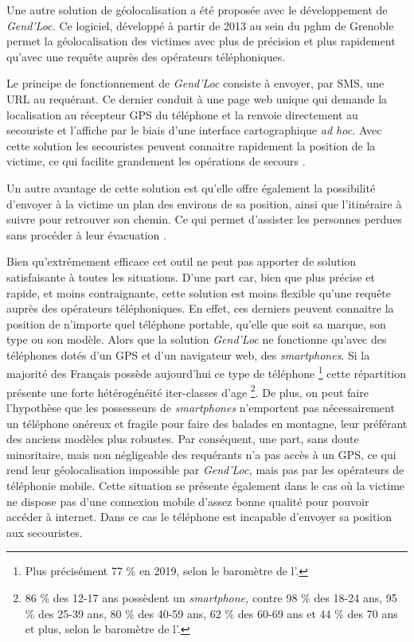Une autre solution de géolocalisation a été proposée avec le
développement de \emph{Gend'Loc.} Ce logiciel, développé à partir de
2013 au sein du \ac{pghm} de Grenoble permet la géolocalisation des
victimes avec plus de précision et plus rapidement qu'avec une requête
auprès des opérateurs téléphoniques.

Le principe de fonctionnement de \emph{Gend'Loc} consiste à envoyer,
par SMS, une URL au requérant. Ce dernier conduit à une page web
unique qui demande la localisation au récepteur GPS du téléphone et la
renvoie directement au secouriste et l'affiche par le biais d'une
interface cartographique \emph{ad hoc.}  Avec cette solution les
secouristes peuvent connaitre rapidement la position de la victime, ce
qui facilite grandement les opérations de secours
\autocite{Muscat2015}.

Un autre avantage de cette solution est qu'elle offre également la
possibilité d'envoyer à la victime un plan des environs de sa
position, ainsi que l'itinéraire à suivre pour retrouver son
chemin. Ce qui permet d'assister les personnes perdues sans procéder à
leur évacuation \autocite{Muscat2015}.

Bien qu’extrêmement efficace cet outil ne peut pas apporter de
solution satisfaisante à toutes les situations. D'une part car, bien
que plus précise et rapide, et moins contraignante, cette solution est
moins flexible qu'une requête auprès des opérateurs téléphoniques.
En effet, ces derniers peuvent connaitre la position de n'importe quel
téléphone portable, qu'elle que soit sa marque, son type ou son
modèle. Alors que la solution \emph{Gend'Loc} ne fonctionne qu'avec
des téléphones dotés d'un GPS et d'un navigateur web, des
\emph{smartphones}. Si la majorité des Français possède aujourd'hui
ce type de téléphone \footnote{Plus précisément 77 \% en 2019, selon
  le baromètre de l'\textcite{ARCEP2019}.} cette répartition présente
une forte hétérogénéité iter-classes d'age \footnote{86 \% des 12-17
  ans possèdent un \emph{smartphone,} contre 98 \% des 18-24 ans, 95
  \% des 25-39 ans, 80 \% des 40-59 ans, 62 \% des 60-69 ans et 44 \%
  des 70 ans et plus, selon le baromètre de
  l'\textcite{ARCEP2019}.}. De plus, on peut faire l'hypothèse que les
possesseurs de \emph{smartphones} n'emportent pas nécessairement un
téléphone onéreux et fragile pour faire des balades en montagne, leur
préférant des anciens modèles plus robustes. Par conséquent, une part,
sans doute minoritaire, mais non négligeable des requérants n'a pas
accès à un GPS, ce qui rend leur géolocalisation impossible par
\emph{Gend'Loc,} mais pas par les opérateurs de téléphonie mobile.
Cette situation se présente également dans le cas où la victime ne
dispose pas d'une connexion mobile d'assez bonne qualité pour pouvoir
accéder à internet. Dans ce cas le téléphone est incapable d'envoyer
sa position aux secouristes.

